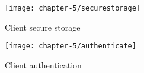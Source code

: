 \begin{figure}
    \centering
    \texttt{[image: chapter-5/securestorage]}
    \caption{Client secure storage}
    \label{code:secure-storage-client}
\end{figure}

\begin{figure}
    \centering
    \texttt{[image: chapter-5/authenticate]}
    \caption{Client authentication}
    \label{code:client-authenticate}
\end{figure}
